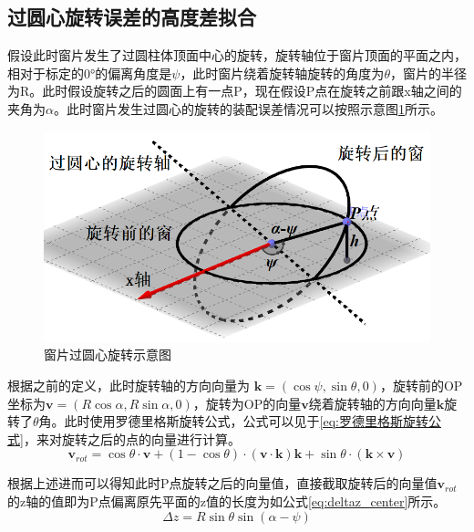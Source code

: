 \documentclass[master]{thesis-uestc}
\begin{document}
\subsection{过圆心旋转误差的高度差拟合}
假设此时窗片发生了过圆柱体顶面中心的旋转，旋转轴位于窗片顶面的平面之内，相对于标定的0°的偏离角度是$\psi$，此时窗片绕着旋转轴旋转的角度为$\theta$，窗片的半径为R。此时假设旋转之后的圆面上有一点P，现在假设P点在旋转之前跟x轴之间的夹角为\(\alpha \)。此时窗片发生过圆心的旋转的装配误差情况可以按照示意图\ref{fig:过圆心旋转示意图}所示。
\begin{figure}[!htb]
    \centering
    \includegraphics[width=0.5\linewidth]{pic/chapter5/过圆心旋转示意图.png}
    \caption{窗片过圆心旋转示意图}
    \label{fig:过圆心旋转示意图}
\end{figure}

根据之前的定义，此时旋转轴的方向向量为 \(\mathbf{k} = (\cos\psi, \sin \theta, 0)\)，旋转前的OP坐标为\(\mathbf{v} = (R\cos \alpha, R\sin \alpha, 0)\)，旋转为OP的向量$\mathbf{v}$绕着旋转轴的方向向量\(\mathbf{k}\)旋转了\(\theta \)角。此时使用罗德里格斯旋转公式，公式可以见于\ref{eq:罗德里格斯旋转公式}，来对旋转之后的点的向量进行计算。
\begin{equation}\label{eq:罗德里格斯旋转公式}
    \mathbf{v}_{rot} = \cos\theta \cdot \mathbf{v} + (1 - \cos\theta) \cdot (\mathbf{v} \cdot \mathbf{k}) \mathbf{k} + \sin\theta \cdot (\mathbf{k} \times \mathbf{v})
\end{equation}

根据上述进而可以得知此时P点旋转之后的向量值，直接截取旋转后的向量值\(\mathbf{v}_{rot}\)的z轴的值即为P点偏离原先平面的z值的长度为如公式\ref{eq:deltaz_center}所示。
\begin{equation}\label{eq:deltaz_center}
    \Delta z = R \sin \theta \sin \left(\alpha -\psi \right)
\end{equation}
\end{document}
